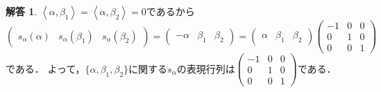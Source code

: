 \documentclass[unicode,11pt]{ltjsarticle}
\theoremstyle{definition}
\newtheorem{ans}{解答}
\newcommand{\inner}[2]{\left\langle #1, #2 \right\rangle}
\numberwithin{equation}{section}
\begin{document}
\begin{ans}
  $\inner{\alpha}{\beta_1} = \inner{\alpha}{\beta_2} = 0$であるから
  \begin{equation}
    \begin{pmatrix}
      s_\alpha(\alpha) & s_\alpha(\beta_1) & s_\alpha(\beta_2)
    \end{pmatrix}
    = \begin{pmatrix}
      -\alpha & \beta_1 & \beta_2
    \end{pmatrix}
    = \begin{pmatrix}
      \alpha & \beta_1 & \beta_2
    \end{pmatrix}
    \begin{pmatrix}
      -1 & 0 & 0\\
      0 & 1 & 0\\
      0 & 0 & 1
    \end{pmatrix}
  \end{equation}
  である．
  よって，$\{\alpha, \beta_1, \beta_2\}$に関する$s_\alpha$の表現行列は$\begin{pmatrix}
    -1 & 0 & 0\\
    0 & 1 & 0\\
    0 & 0 & 1
  \end{pmatrix}$である．
\end{ans}
\end{document}
